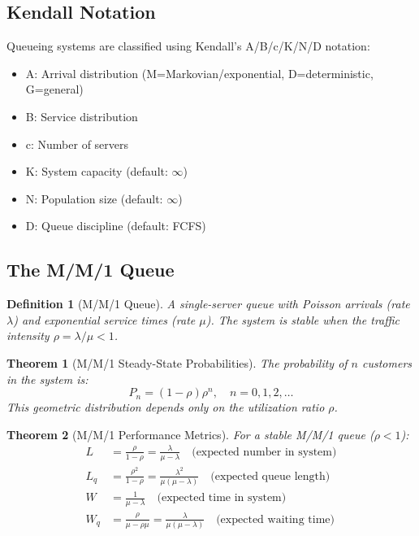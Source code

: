 \documentclass[a4paper, 11pt]{article}
\newtheorem{definition}{Definition}[section]
\newtheorem{theorem}{Theorem}[section]
\begin{document}
\subsection{Kendall Notation}

Queueing systems are classified using Kendall's A/B/c/K/N/D notation:
\begin{itemize}
\item A: Arrival distribution (M=Markovian/exponential, D=deterministic, G=general)
\item B: Service distribution
\item c: Number of servers
\item K: System capacity (default: $\infty$)
\item N: Population size (default: $\infty$)
\item D: Queue discipline (default: FCFS)
\end{itemize}

\subsection{The M/M/1 Queue}

\begin{definition}[M/M/1 Queue]
A single-server queue with Poisson arrivals (rate $\lambda$) and exponential service times (rate $\mu$). The system is stable when the traffic intensity $\rho = \lambda/\mu < 1$.
\end{definition}

\begin{theorem}[M/M/1 Steady-State Probabilities]
The probability of $n$ customers in the system is:
\begin{equation}
P_n = (1 - \rho)\rho^n, \quad n = 0, 1, 2, \ldots
\end{equation}
This geometric distribution depends only on the utilization ratio $\rho$.
\end{theorem}

\begin{theorem}[M/M/1 Performance Metrics]
For a stable M/M/1 queue ($\rho < 1$):
\begin{align}
L &= \frac{\rho}{1-\rho} = \frac{\lambda}{\mu - \lambda} \quad \text{(expected number in system)} \\
L_q &= \frac{\rho^2}{1-\rho} = \frac{\lambda^2}{\mu(\mu-\lambda)} \quad \text{(expected queue length)} \\
W &= \frac{1}{\mu - \lambda} \quad \text{(expected time in system)} \\
W_q &= \frac{\rho}{\mu - \rho\mu} = \frac{\lambda}{\mu(\mu-\lambda)} \quad \text{(expected waiting time)}
\end{align}
\end{theorem}
\end{document}
